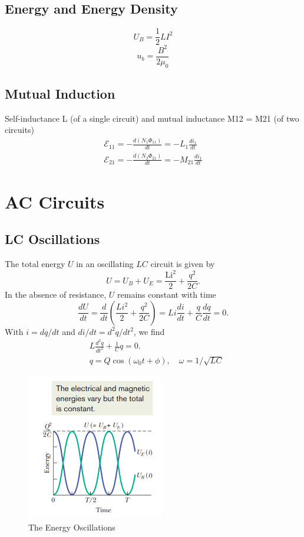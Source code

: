 \documentclass[11pt, a4paper]{article}
\begin{document}
\subsection{Energy and Energy Density}
$$U_B = \frac{1}{2}LI^2$$
$$u_b = \frac{B^2}{2\mu_0}$$
\subsection{Mutual Induction}
Self-inductance L (of a single circuit) and
mutual inductance M12 = M21 (of two circuits)
$$\begin{gathered}
    \mathcal{E}_{11}=-\frac{d(N_1\Phi_{11})}{dt}=-L_1\frac{di_1}{dt} \\
    \mathcal{E}_{21}=-\frac{d(N_2\Phi_{21})}{dt}=-M_{21}\frac{di_1}{dt} 
    \end{gathered}$$
\section{AC Circuits}
\subsection{LC Oscillations}
The total energy $U$ in an oscillating $LC$ circuit is given by
$$
U=U_B+U_E=\frac{\mathrm{Li}^2}2+\frac{q^2}{2C}.
$$
In the absence of resistance, $U$ remains constant with time
$$
\frac{dU}{dt}=\frac d{dt}\left(\frac{Li^2}2+\frac{q^2}{2C}\right)=Li\frac{di}{dt}+\frac qC\frac{dq}{dt}=0.
$$
With $i=dq/dt$ and $di/dt=d^2q/dt^2$, we find 
$$\begin{aligned}&L\frac{d^2q}{dt^2}+\frac1Cq=0.\\
    &q = Q\cos(\omega_0 t + \phi), \quad \omega = 1/\sqrt{LC}
\end{aligned}$$
\begin{figure}[htbp]
    \centering
    \includegraphics[width = 6cm]{Energy Oscillator.png}
    \caption{The Energy Oscillations}
\end{figure}
\end{document}
